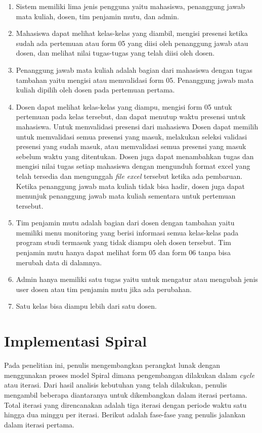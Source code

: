 \begin{enumerate}
	\item Sistem memiliki lima jenis pengguna yaitu mahasiswa, penanggung jawab mata kuliah, dosen, tim penjamin mutu, dan admin.
	\item Mahasiswa dapat melihat kelas-kelas yang diambil, mengisi presensi ketika sudah ada pertemuan atau form 05 yang diisi oleh penanggung jawab atau dosen, dan melihat nilai tugas-tugas yang telah diisi oleh dosen.
	\item Penanggung jawab mata kuliah adalah bagian dari mahasiswa dengan tugas tambahan yaitu  mengisi atau memvalidasi form 05. Penanggung jawab mata kuliah dipilih oleh dosen pada pertemuan pertama.
	\item Dosen dapat melihat kelas-kelas yang diampu, mengisi form 05 untuk pertemuan pada kelas tersebut, dan dapat menutup waktu presensi untuk mahasiswa. Untuk memvalidasi presensi dari mahasiswa Dosen dapat memilih untuk memvalidasi semua presensi yang masuk, melakukan seleksi validasi presensi yang sudah masuk, atau memvalidasi semua presensi yang masuk sebelum waktu yang ditentukan.  Dosen juga dapat menambahkan tugas dan mengisi nilai tugas setiap mahasiswa dengan mengunduh format excel yang telah tersedia dan mengunggah \textit{file excel} tersebut ketika ada pembaruan. Ketika penanggung jawab mata kuliah tidak bisa hadir, dosen juga dapat menunjuk penanggung jawab mata kuliah sementara untuk pertemuan tersebut.
	\item Tim penjamin mutu adalah bagian dari dosen dengan tambahan yaitu memiliki menu monitoring yang berisi informasi semua kelas-kelas pada program studi termasuk yang tidak diampu oleh dosen tersebut. Tim penjamin mutu hanya dapat melihat form 05 dan form 06 tanpa bisa merubah data di dalamnya.
	\item Admin hanya memiliki satu tugas yaitu untuk mengatur atau mengubah jenis user dosen atau tim penjamin mutu jika ada perubahan.
	\item Satu kelas bisa diampu lebih dari satu dosen.
	
\end{enumerate}


\section{Implementasi Spiral}


Pada penelitian ini, penulis mengembangkan perangkat lunak dengan menggunakan proses model Spiral dimana pengembangan dilakukan dalam \emph{cycle} atau iterasi. Dari hasil analisis kebutuhan yang telah dilakukan, penulis mengambil beberapa diantaranya untuk dikembangkan dalam iterasi pertama. Total iterasi yang direncanakan adalah tiga iterasi dengan periode waktu satu hingga dua minggu per iterasi. Berikut adalah fase-fase yang penulis jalankan dalam iterasi pertama.

